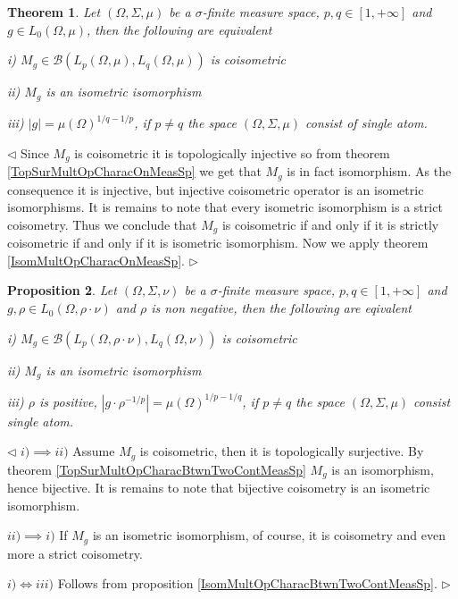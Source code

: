 \documentclass[12pt]{article}
\newtheorem{theorem}{Theorem}[subsection]
\newtheorem{proposition}[theorem]{Proposition}
\newenvironment{proof}{\par $\triangleleft$}{$\triangleright$}
\begin{document}
\begin{theorem}\label{CoisomMultOpCharacOnMeasSp} Let $(\Omega,\Sigma,\mu)$ be a $\sigma$-finite measure space, $p,q\in[1,+\infty]$ and $g\in L_0(\Omega,\mu)$, then the following are equivalent

i) $M_g\in\mathcal{B}(L_p(\Omega,\mu),L_q(\Omega,\mu))$ is coisometric

ii) $M_g$ is an isometric isomorphism

iii) $|g|=\mu(\Omega)^{1/q-1/p}$, if $p\neq q$ the space $(\Omega,\Sigma,\mu)$ consist of single atom.
\end{theorem}
\begin{proof} Since $M_g$ is coisometric it is topologically injective so from theorem \ref{TopSurMultOpCharacOnMeasSp} we get that $M_g$ is in fact isomorphism. As the consequence it is injective, but injective coisometric operator is an isometric isomorphisms. It is remains to note that every isometric isomorphism is a strict coisometry. Thus we conclude that $M_g$ is coisometric if and only if it is strictly coisometric if and only if it is isometric isomorphism. Now we apply theorem \ref{IsomMultOpCharacOnMeasSp}.
\end{proof}

\begin{proposition}\label{CoisomMultOpCharacBtwnTwoContMeasSp} Let $(\Omega,\Sigma,\nu)$ be a $\sigma$-finite measure space, $p,q\in[1,+\infty]$ and $g,\rho\in L_0(\Omega,\rho\cdot\nu)$ and $\rho$ is non negative, then the following are eqivalent

i) $M_g\in\mathcal{B}(L_p(\Omega,\rho\cdot\nu),L_q(\Omega,\nu))$ is coisometric

ii) $M_g$ is an isometric isomorphism

iii) $\rho$ is positive, $|g\cdot \rho^{-1/p}|=\mu(\Omega)^{1/p-1/q}$, if $p\neq q$ the space $(\Omega,\Sigma,\mu)$ consist single atom.
\end{proposition}
\begin{proof} $i)\implies ii)$ Assume $M_g$ is coisometric, then it is topologically surjective. By theorem \ref{TopSurMultOpCharacBtwnTwoContMeasSp} $M_g$ is an isomorphism, hence bijective. It is remains to note that bijective coisometry is an isometric isomorphism.

$ii)\implies i)$ If $M_g$ is an isometric isomorphism, of course, it is coisometry and even more a strict coisometry.

$i)\Longleftrightarrow iii)$ Follows from proposition \ref{IsomMultOpCharacBtwnTwoContMeasSp}.
\end{proof}
\end{document}
